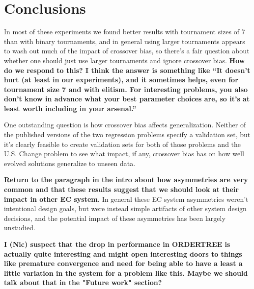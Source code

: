 \documentclass{sig-alternate}
\begin{document}
\section{Conclusions} \label{sec:Conclusions}

In most of these experiments we found better results with tournament sizes of 7 than with binary tournaments, and in 
general using larger tournaments appears to wash out much of the impact of crossover bias, so there's a fair question 
about whether one should just use larger tournaments and ignore crossover bias. \textbf{How do we respond to this? I 
think the answer is something like ``It doesn't hurt (at least in our experiments), and it sometimes helps, even for 
tournament size 7 and with elitism. For interesting problems, you also don't know in advance what your best parameter 
choices are, so it's at least worth including in your arsenal.''}

One outstanding question is how crossover bias affects generalization. Neither of the published versions 
of the two regression problems specify a validation set, but it's clearly feasible to create validation sets 
for both of those problems and the U.S. Change problem to see what impact, if any, crossover bias has 
on how well evolved solutions generalize to unseen data.

\textbf{Return to the paragraph in the intro about how asymmetries are very common and that these results suggest that we should look at their impact in other EC system.}
In general these 
EC system
asymmetries weren't intentional design goals, but were instead simple artifacts of other system design decisions, and 
the potential impact of these asymmetries has been largely unstudied.

\textbf{I (Nic) suspect that the drop in performance in ORDERTREE is actually quite interesting and might open interesting doors to things like premature
	convergence and need for being able to have a least a little variation in the system for a problem like this. Maybe we
	should talk about that in the "Future work" section?}





\end{document}

